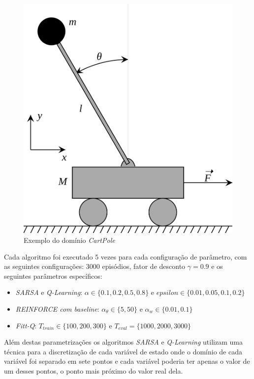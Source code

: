 \documentclass[letterpaper]{article}
\begin{document}
\begin{figure}[t]
  \centering
  \includegraphics[width=0.9\columnwidth]{cart-pole}
  \caption{Exemplo do domínio \textit{CartPole}}
  \label{fig:cart-pole}
\end{figure}

Cada algoritmo foi executado 5 vezes para cada configuração de parâmetro, com as seguintes configurações: 3000 episódios, fator de desconto $\gamma = 0.9$ e os seguintes parâmetros específicos:

\begin{itemize}
  \item \textit{SARSA} e \textit{Q-Learning}: $\alpha \in \{ 0.1, 0.2, 0.5, 0.8 \}$ e $epsilon \in \{ 0.01, 0.05, 0.1, 0.2 \}$
  \item \textit{REINFORCE com baseline}: $\alpha_{\theta} \in \{ 5, 50 \}$ e $\alpha_{w} \in \{ 0.01, 0.1 \}$
  \item \textit{Fitt-Q}: $T_{train} \in \{ 100, 200, 300 \} $ e $T_{eval} = \{ 1000, 2000, 3000 \}$
\end{itemize}

Além destas parametrizações os algoritmos \textit{SARSA} e \textit{Q-Learning} utilizam uma técnica para a discretização de cada variável de estado onde o domínio de cada variável foi separado em sete pontos e cada variável poderia ter apenas o valor de um desses pontos, o ponto mais próximo do valor real dela. 
\end{document}
